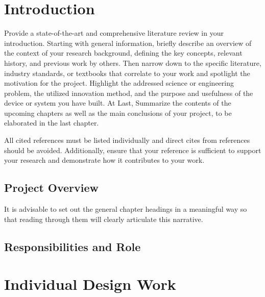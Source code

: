 \documentclass{senior-design-individual}
\begin{document}
\chapter{Introduction}
Provide a state-of-the-art and comprehensive literature review in your introduction. Starting with general information, briefly describe an overview of the context of your research background, defining the key concepts, relevant history, and previous work by others. Then narrow down to the specific literature, industry standards, or textbooks that correlate to your work and spotlight the motivation for the project. Highlight the addressed science or engineering problem, the utilized innovation method, and the purpose and usefulness of the device or system you have built. At Last, Summarize the contents of the upcoming chapters as well as the main conclusions of your project, to be elaborated in the last chapter.

All cited references must be listed individually and direct cites from references should be avoided. Additionally, ensure that your reference is sufficient to support your research and demonstrate how it contributes to your work.

\section{Project Overview}
It is advisable to set out the general chapter headings in a meaningful way so that reading through them will clearly articulate this narrative.
\section{Responsibilities and Role}
\chapter{Individual Design Work}
\end{document}
